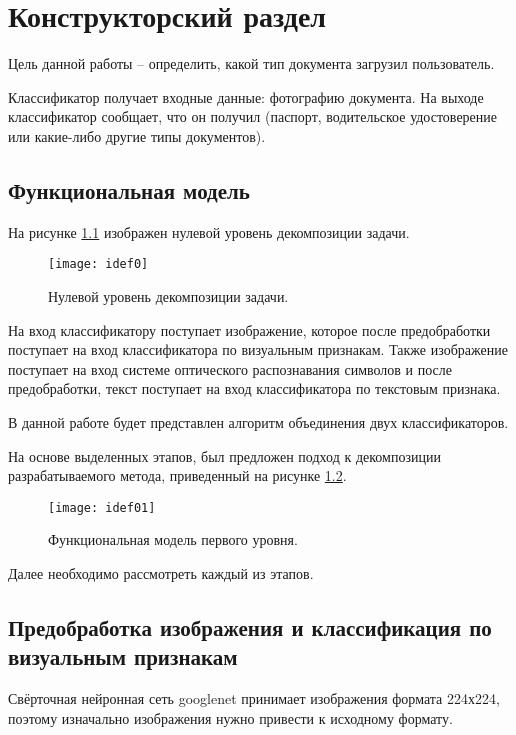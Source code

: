 \chapter{\textbf{Конструкторский раздел}}

Цель данной работы -- определить, какой тип документа загрузил пользователь.

Классификатор получает входные данные: фотографию документа. На выходе классификатор сообщает, что он получил (паспорт, водительское удостоверение или какие-либо другие типы документов).

\section{Функциональная модель}

На рисунке \ref{img:idef0} изображен нулевой уровень декомпозиции задачи. 

\begin{figure}[H]
	\centering
	\texttt{[image: idef0]}
	\caption{Нулевой уровень декомпозиции задачи. }
	\label{img:idef0}
\end{figure}

На вход классификатору поступает изображение, которое после предобработки поступает на вход классификатора по визуальным признакам. Также изображение поступает на вход системе оптического распознавания символов и после предобработки, текст поступает на вход классификатора по текстовым признака.

В данной работе будет представлен алгоритм объединения двух классификаторов.

На основе выделенных этапов, был предложен подход к декомпозиции разрабатываемого метода, приведенный на рисунке \ref{img:idef01}.

\begin{figure}[H]
	\centering
	\texttt{[image: idef01]}
	\caption{Функциональная модель первого уровня. }
	\label{img:idef01}
\end{figure}

Далее необходимо рассмотреть каждый из этапов.

\section{Предобработка изображения и классификация по визуальным признакам}

Свёрточная нейронная сеть googlenet принимает изображения формата 224х224, поэтому изначально изображения нужно привести к исходному формату.

